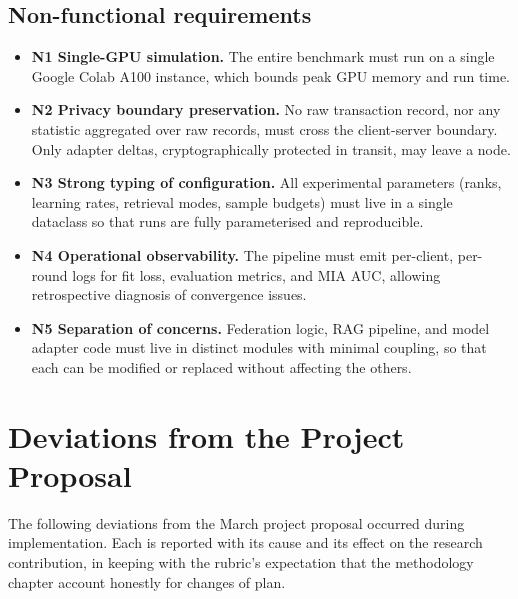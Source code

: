 \documentclass{report}
\begin{document}
\subsection{Non-functional requirements}

\begin{itemize}
    \setlength\itemsep{0em}
    \item \textbf{N1 Single-GPU simulation.} The entire benchmark must run on a single Google Colab A100 instance, which bounds peak GPU memory and run time.
    \item \textbf{N2 Privacy boundary preservation.} No raw transaction record, nor any statistic aggregated over raw records, must cross the client-server boundary. Only adapter deltas, cryptographically protected in transit, may leave a node.
    \item \textbf{N3 Strong typing of configuration.} All experimental parameters (ranks, learning rates, retrieval modes, sample budgets) must live in a single dataclass so that runs are fully parameterised and reproducible.
    \item \textbf{N4 Operational observability.} The pipeline must emit per-client, per-round logs for fit loss, evaluation metrics, and MIA AUC, allowing retrospective diagnosis of convergence issues.
    \item \textbf{N5 Separation of concerns.} Federation logic, RAG pipeline, and model adapter code must live in distinct modules with minimal coupling, so that each can be modified or replaced without affecting the others.
\end{itemize}

\section{Deviations from the Project Proposal}
\label{sec:meth:deviations}

The following deviations from the March project proposal occurred during implementation. Each is reported with its cause and its effect on the research contribution, in keeping with the rubric's expectation that the methodology chapter account honestly for changes of plan.
\end{document}
